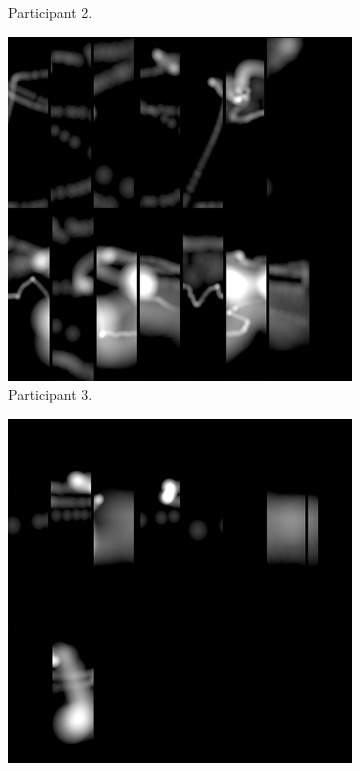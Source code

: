 \begin{figure}[!ht]
\begin{subfigure}[b]{0.24\textwidth}
        \caption{Participant 2.}
    \end{subfigure}
    \hfill
    \begin{subfigure}[b]{0.24\textwidth}
        \centering
        \includegraphics[width=\textwidth]{img/data/Panel2/single/3.png}
        \caption{Participant 3.}
    \end{subfigure}
    \hfill
    \begin{subfigure}[b]{0.24\textwidth}
        \centering
        \includegraphics[width=\textwidth]{img/data/Panel2/single/4.png}

\end{subfigure}
\end{figure}
